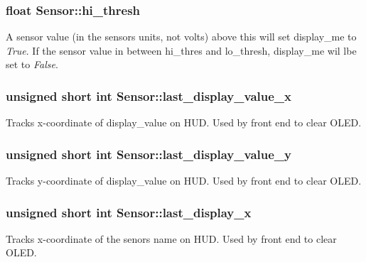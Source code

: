 \subsubsection[{\texorpdfstring{hi\+\_\+thresh}{hi_thresh}}]{\setlength{\rightskip}{0pt plus 5cm}float Sensor\+::hi\+\_\+thresh}\hypertarget{classSensor_a66b9a03da7810ac51d8724b250fee747}{}\label{classSensor_a66b9a03da7810ac51d8724b250fee747}
A sensor value (in the sensor\textquotesingle{}s units, not volts) above this will set display\+\_\+me to {\itshape True}. If the sensor value in between hi\+\_\+thres and lo\+\_\+thresh, display\+\_\+me wil lbe set to {\itshape False}. 
\subsubsection[{\texorpdfstring{last\+\_\+display\+\_\+value\+\_\+x}{last_display_value_x}}]{\setlength{\rightskip}{0pt plus 5cm}unsigned short int Sensor\+::last\+\_\+display\+\_\+value\+\_\+x}\hypertarget{classSensor_a189156cf6f62b9f94b88a7cb54ad32e5}{}\label{classSensor_a189156cf6f62b9f94b88a7cb54ad32e5}
Tracks x-\/coordinate of display\+\_\+value on H\+UD. Used by front end to clear O\+L\+ED. 
\subsubsection[{\texorpdfstring{last\+\_\+display\+\_\+value\+\_\+y}{last_display_value_y}}]{\setlength{\rightskip}{0pt plus 5cm}unsigned short int Sensor\+::last\+\_\+display\+\_\+value\+\_\+y}\hypertarget{classSensor_ab92d6ca846f827db0d4e6d6f169a6df5}{}\label{classSensor_ab92d6ca846f827db0d4e6d6f169a6df5}
Tracks y-\/coordinate of display\+\_\+value on H\+UD. Used by front end to clear O\+L\+ED. 
\subsubsection[{\texorpdfstring{last\+\_\+display\+\_\+x}{last_display_x}}]{\setlength{\rightskip}{0pt plus 5cm}unsigned short int Sensor\+::last\+\_\+display\+\_\+x}\hypertarget{classSensor_ad6c53c063c3494cabb8db1db7a73f1c4}{}\label{classSensor_ad6c53c063c3494cabb8db1db7a73f1c4}
Tracks x-\/coordinate of the senor\textquotesingle{}s name on H\+UD. Used by front end to clear O\+L\+ED. 

